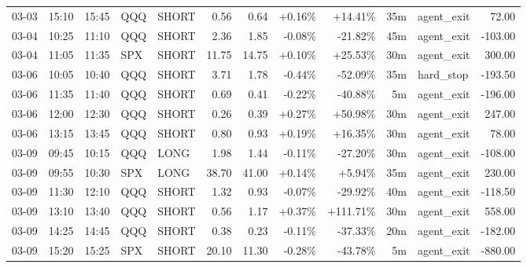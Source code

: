 \documentclass[11pt,a4paper,twoside]{article}
\begin{document}
\begin{center}
\begin{longtable}{>{\color{txtmain}}l l l l l r r r r r >{\color{txtmain}}l r}
03-03 & 15:10 & 15:45 & QQQ & SHORT & 0.56 & 0.64 & \textcolor{wingreen}{+0.16\%} & \textcolor{wingreen}{+14.41\%} & 35m & agent\_exit & \textcolor{wingreen}{72.00} \\
03-04 & 10:25 & 11:10 & QQQ & SHORT & 2.36 & 1.85 & \textcolor{lossred}{-0.08\%} & \textcolor{lossred}{-21.82\%} & 45m & agent\_exit & \textcolor{lossred}{-103.00} \\
03-04 & 11:05 & 11:35 & SPX & SHORT & 11.75 & 14.75 & \textcolor{wingreen}{+0.10\%} & \textcolor{wingreen}{+25.53\%} & 30m & agent\_exit & \textcolor{wingreen}{300.00} \\
03-06 & 10:05 & 10:40 & QQQ & SHORT & 3.71 & 1.78 & \textcolor{lossred}{-0.44\%} & \textcolor{lossred}{-52.09\%} & 35m & hard\_stop & \textcolor{lossred}{-193.50} \\
03-06 & 11:35 & 11:40 & QQQ & SHORT & 0.69 & 0.41 & \textcolor{lossred}{-0.22\%} & \textcolor{lossred}{-40.88\%} & 5m & agent\_exit & \textcolor{lossred}{-196.00} \\
03-06 & 12:00 & 12:30 & QQQ & SHORT & 0.26 & 0.39 & \textcolor{wingreen}{+0.27\%} & \textcolor{wingreen}{+50.98\%} & 30m & agent\_exit & \textcolor{wingreen}{247.00} \\
03-06 & 13:15 & 13:45 & QQQ & SHORT & 0.80 & 0.93 & \textcolor{wingreen}{+0.19\%} & \textcolor{wingreen}{+16.35\%} & 30m & agent\_exit & \textcolor{wingreen}{78.00} \\
03-09 & 09:45 & 10:15 & QQQ & LONG & 1.98 & 1.44 & \textcolor{lossred}{-0.11\%} & \textcolor{lossred}{-27.20\%} & 30m & agent\_exit & \textcolor{lossred}{-108.00} \\
03-09 & 09:55 & 10:30 & SPX & LONG & 38.70 & 41.00 & \textcolor{wingreen}{+0.14\%} & \textcolor{wingreen}{+5.94\%} & 35m & agent\_exit & \textcolor{wingreen}{230.00} \\
03-09 & 11:30 & 12:10 & QQQ & SHORT & 1.32 & 0.93 & \textcolor{lossred}{-0.07\%} & \textcolor{lossred}{-29.92\%} & 40m & agent\_exit & \textcolor{lossred}{-118.50} \\
03-09 & 13:10 & 13:40 & QQQ & SHORT & 0.56 & 1.17 & \textcolor{wingreen}{+0.37\%} & \textcolor{wingreen}{+111.71\%} & 30m & agent\_exit & \textcolor{wingreen}{558.00} \\
03-09 & 14:25 & 14:45 & QQQ & SHORT & 0.38 & 0.23 & \textcolor{lossred}{-0.11\%} & \textcolor{lossred}{-37.33\%} & 20m & agent\_exit & \textcolor{lossred}{-182.00} \\
03-09 & 15:20 & 15:25 & SPX & SHORT & 20.10 & 11.30 & \textcolor{lossred}{-0.28\%} & \textcolor{lossred}{-43.78\%} & 5m & agent\_exit & \textcolor{lossred}{-880.00} \\

\end{longtable}
\end{center}
\end{document}
